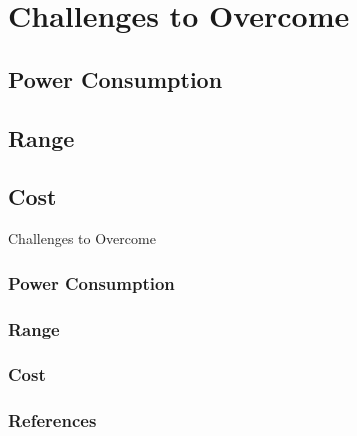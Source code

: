 \documentclass{beamer}
\begin{document}
\section{Challenges to Overcome}
\subsection{Power Consumption}
\subsection{Range}
\subsection{Cost}

\begin{frame}{Challenges to Overcome}
  \frametitle{Power Consumption}
  \frametitle{Range}
  \frametitle{Cost}
\end{frame}

\begin{frame}[allowframebreaks]
  \frametitle{References}
  \printbibliography
\end{frame}
\end{document}
